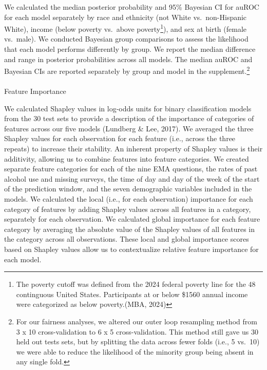 \documentclass[
]{agujournal2019}
\makeatletter
\let\oldparagraph\paragraph
\renewcommand{\paragraph}{
    \@ifstar
      \xxxParagraphStar
      \xxxParagraphNoStar
  }
\newcommand{\xxxParagraphStar}[1]{\oldparagraph*{#1}\mbox{}}
\newcommand{\xxxParagraphNoStar}[1]{\oldparagraph{#1}\mbox{}}
\makeatother
\begin{document}
We calculated the median posterior probability and 95\% Bayesian CI for
auROC for each model separately by race and ethnicity (not White
vs.~non-Hispanic White), income (below poverty vs.~above
poverty\footnote{The poverty cutoff was defined from the 2024 federal
  poverty line for the 48 continguous United States. Participants at or
  below \$1560 annual income were categorized as below poverty.(MBA,
  2024)}), and sex at birth (female vs.~male). We conducted Bayesian
group comparisons to assess the likelihood that each model performs
differently by group. We report the median difference and range in
posterior probabilities across all models. The median auROC and Bayesian
CIs are reported separately by group and model in the
supplement.\footnote{For our fairness analyses, we altered our outer
  loop resampling method from 3 x 10 cross-validation to 6 x 5
  cross-validation. This method still gave us 30 held out tests sets,
  but by splitting the data across fewer folds (i.e., 5 vs.~10) we were
  able to reduce the likelihood of the minority group being absent in
  any single fold.}

\paragraph{Feature Importance}\label{feature-importance}

We calculated Shapley values in log-odds units for binary classification
models from the 30 test sets to provide a description of the importance
of categories of features across our five models (Lundberg \& Lee,
2017). We averaged the three Shapley values for each observation for
each feature (i.e., across the three repeats) to increase their
stability. An inherent property of Shapley values is their additivity,
allowing us to combine features into feature categories. We created
separate feature categories for each of the nine EMA questions, the
rates of past alcohol use and missing surveys, the time of day and day
of the week of the start of the prediction window, and the seven
demographic variables included in the models. We calculated the local
(i.e., for each observation) importance for each category of features by
adding Shapley values across all features in a category, separately for
each observation. We calculated global importance for each feature
category by averaging the absolute value of the Shapley values of all
features in the category across all observations. These local and global
importance scores based on Shapley values allow us to contextualize
relative feature importance for each model.
\end{document}
